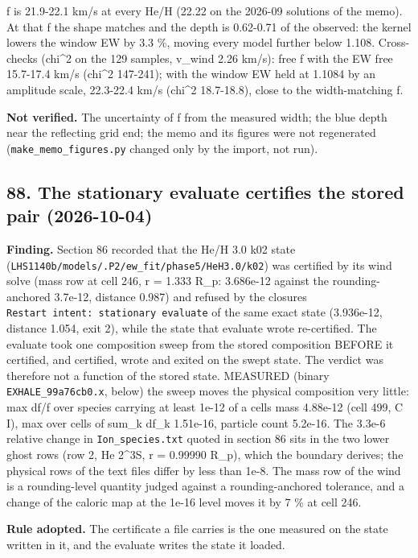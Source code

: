 \documentclass[english,a4paper]{my_memo}
\begin{document}
f is 21.9-22.1 km/s at every He/H (22.22 on the 2026-09 solutions of the
memo). At that f the shape matches and the depth is 0.62-0.71 of the
observed: the kernel lowers the window EW by 3.3 \%, moving every model
further below 1.108. Cross-checks (chi\^{}2 on the 129 samples, v\_wind 2.26
km/s): free f with the EW free 15.7-17.4 km/s (chi\^{}2 147-241); with the
window EW held at 1.1084 by an amplitude scale, 22.3-22.4 km/s (chi\^{}2
18.7-18.8), close to the width-matching f.

\textbf{Not verified.} The uncertainty of f from the measured width; the blue
depth near the reflecting grid end; the memo and its figures were not
regenerated (\texttt{make\_memo\_figures.py} changed only by the import, not run).

\subsection{88. The stationary evaluate certifies the stored pair (2026-10-04)}\label{88-the-stationary-evaluate-certifies-the-stored-pair-2026-10-04}

\textbf{Finding.} Section 86 recorded that the He/H 3.0 k02 state
(\texttt{LHS1140b/models/.P2/ew\_fit/phase5/HeH3.0/k02}) was certified by its wind
solve (mass row at cell 246, r = 1.333 R\_p: 3.686e-12 against the
rounding-anchored 3.7e-12, distance 0.987) and refused by the closure\textquotesingle s
\texttt{Restart\ intent:\ stationary\ evaluate} of the same exact state (3.936e-12,
distance 1.054, exit 2), while the state that evaluate wrote re-certified.
The evaluate took one composition sweep from the stored composition BEFORE it
certified, and certified, wrote and exited on the swept state. The verdict was
therefore not a function of the stored state. MEASURED (binary
\texttt{EXHALE\_99a76cb0.x}, below) the sweep moves the physical composition very
little: max \textbar df\textbar/f over species carrying at least 1e-12 of a cell\textquotesingle s mass
4.88e-12 (cell 499, C I), max over cells of sum\_k \textbar df\_k\textbar{} 1.51e-16, particle
count 5.2e-16. The 3.3e-6 relative change in \texttt{Ion\_species.txt} quoted in
section 86 sits in the two lower ghost rows (row 2, He 2\^{}3S, r = 0.99990
R\_p), which the boundary derives; the physical rows of the text files differ
by less than 1e-8. The mass row of the wind is a rounding-level quantity
judged against a rounding-anchored tolerance, and a change of the caloric map
at the 1e-16 level moves it by 7 \% at cell 246.

\textbf{Rule adopted.} The certificate a file carries is the one measured on the
state written in it, and the evaluate writes the state it loaded.
\end{document}
